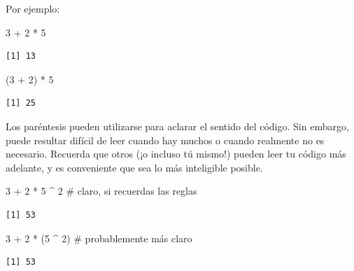 \documentclass[
  letterpaper,
  DIV=11,
  numbers=noendperiod]{scrreprt}
\newenvironment{Shaded}{\begin{snugshade}}{\end{snugshade}}
\newcommand{\CommentTok}[1]{\textcolor[rgb]{0.37,0.37,0.37}{#1}}
\newcommand{\DecValTok}[1]{\textcolor[rgb]{0.68,0.00,0.00}{#1}}
\newcommand{\NormalTok}[1]{\textcolor[rgb]{0.00,0.23,0.31}{#1}}
\newcommand{\SpecialCharTok}[1]{\textcolor[rgb]{0.37,0.37,0.37}{#1}}
\begin{document}
Por ejemplo:

\begin{Shaded}
\begin{Highlighting}[]
\DecValTok{3} \SpecialCharTok{+} \DecValTok{2} \SpecialCharTok{*} \DecValTok{5}
\end{Highlighting}
\end{Shaded}

\begin{verbatim}
[1] 13
\end{verbatim}

\begin{Shaded}
\begin{Highlighting}[]
\NormalTok{(}\DecValTok{3} \SpecialCharTok{+} \DecValTok{2}\NormalTok{) }\SpecialCharTok{*} \DecValTok{5}
\end{Highlighting}
\end{Shaded}

\begin{verbatim}
[1] 25
\end{verbatim}

Los paréntesis pueden utilizarse para aclarar el sentido del código. Sin
embargo, puede resultar difícil de leer cuando hay muchos o cuando
realmente no es necesario. Recuerda que otros (¡o incluso tú mismo!)
pueden leer tu código más adelante, y es conveniente que sea lo más
inteligible posible.

\begin{Shaded}
\begin{Highlighting}[]
\DecValTok{3} \SpecialCharTok{+} \DecValTok{2} \SpecialCharTok{*} \DecValTok{5} \SpecialCharTok{\^{}} \DecValTok{2}       \CommentTok{\# claro, si recuerdas las reglas}
\end{Highlighting}
\end{Shaded}

\begin{verbatim}
[1] 53
\end{verbatim}

\begin{Shaded}
\begin{Highlighting}[]
\DecValTok{3} \SpecialCharTok{+} \DecValTok{2} \SpecialCharTok{*}\NormalTok{ (}\DecValTok{5} \SpecialCharTok{\^{}} \DecValTok{2}\NormalTok{)     }\CommentTok{\# probablemente más claro}
\end{Highlighting}
\end{Shaded}

\begin{verbatim}
[1] 53
\end{verbatim}
\end{document}
